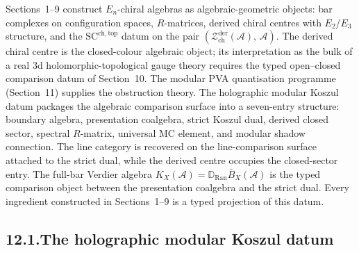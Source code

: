 \documentclass[11pt,reqno]{amsart}
\theoremstyle{definition}
\theoremstyle{remark}
\providecommand{\cA}{\mathcal{A}}
\providecommand{\cZ}{\mathcal{Z}}
\providecommand{\Ran}{\mathrm{Ran}}
\providecommand{\SCchtop}{\mathrm{SC}^{\mathrm{ch,top}}}
\providecommand{\der}{\mathrm{der}}
\providecommand{\ch}{\mathrm{ch}}
\numberwithin{equation}{section}
\begin{document}
Sections~1--9 construct $E_n$-chiral algebras as
algebraic-geometric objects: bar complexes on configuration
spaces, $R$-matrices, derived chiral centres with $E_2$/$E_3$
structure, and the $\SCchtop$ datum on the pair
$(\cZ^{\der}_{\ch}(\cA),\, \cA)$. The derived chiral centre is the
closed-colour algebraic object; its interpretation as the bulk of a
real $3$d holomorphic-topological gauge theory requires the typed
open--closed comparison datum of Section~10. The modular PVA
quantisation programme (Section~11) supplies the obstruction theory.
The holographic modular Koszul datum packages the algebraic
comparison surface into a seven-entry structure: boundary algebra,
presentation coalgebra, strict Koszul dual, derived closed sector,
spectral $R$-matrix, universal MC element, and modular shadow
connection. The line category is recovered on the line-comparison
surface attached to the strict dual, while the derived centre occupies
the closed-sector entry.  The full-bar Verdier algebra
$K_X(\cA)=\mathbb D_{\Ran}\bar B_X(\cA)$ is the typed comparison
object between the presentation coalgebra and the strict dual. Every
ingredient constructed in Sections~1--9 is a typed
projection of this datum.

\subsection*{12.1.\enspace The holographic modular Koszul datum}
\end{document}
